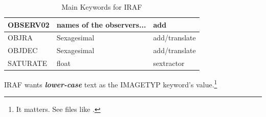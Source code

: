 \documentclass[letter,11pt,oneside]{article}
\newcommand{\dhl}[1]{{\color{verbcolor}{\texttt#1}}}
\begin{document}
\begin{table}[h!]
\begin{tabular}{ l  l l}
OBSERV02   & names of the observers...                      & add \\
\hline
OBJRA      & Sexagesimal                                    & add/translate \\
OBJDEC     & Sexagesimal                                    & add/translate \\
\hline
SATURATE   & float                                          & sextractor \\
\hline
\end{tabular}
\caption{Main Keywords for IRAF}
\label{table:MainKeywords}
\end{table}


IRAF wants \textbf{\emph{lower-case}} text as the IMAGETYP keyword's
value.\footnote{It matters. See files like
  \dhl{iraf/noao/imred/ccdred/ccddb/kpno/camera.dat}.}
\end{document}
